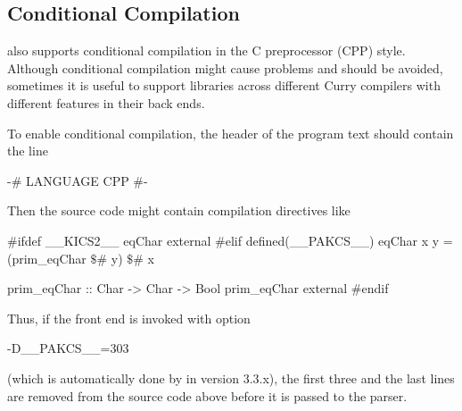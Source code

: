 \subsection{Conditional Compilation}

\CYS also supports conditional compilation in the C preprocessor (CPP)
style. Although conditional compilation might cause problems
and should be avoided, sometimes it is useful to support libraries
across different Curry compilers with different features
in their back ends.

To enable conditional compilation, the header of the program text
should contain the line
%
\begin{curry}
{-# LANGUAGE CPP #-}
\end{curry}
%
Then the source code might contain compilation directives like
%
\begin{curry}
#ifdef __KICS2__
eqChar external
#elif defined(__PAKCS__)
eqChar x y = (prim_eqChar $\$$# y) $\$$# x

prim_eqChar :: Char -> Char -> Bool
prim_eqChar external
#endif
\end{curry}
%
Thus, if the front end is invoked with option
\begin{curry}
-D__PAKCS__=303
\end{curry}
(which is automatically done by \CYS in version 3.3.x),
the first three and the last lines are removed from the
source code above before it is passed to the parser.

